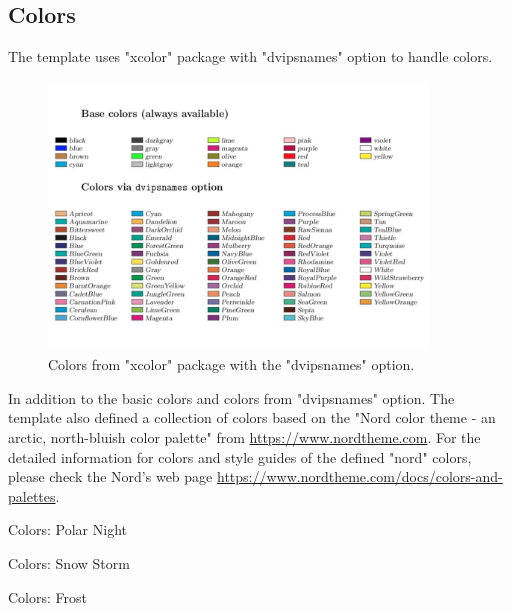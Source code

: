 \newpage
\subsection{Colors}
The template uses "xcolor" package with "dvipsnames" option to handle colors.

\begin{figure}[h!]
    \centering
    \includegraphics[width=0.9\textwidth]{chapter-1/sections/figs/colors.pdf}
    \caption{Colors from "xcolor" package with the "dvipsnames" option.}
\end{figure}

In addition to the basic colors and colors from "dvipsnames" option.
The template also defined a collection of colors based on the "Nord color theme
- an arctic, north-bluish color palette" from \url{https://www.nordtheme.com}.
For the detailed information for colors and style guides of the defined "nord" colors, please
check the Nord's web page
\url{https://www.nordtheme.com/docs/colors-and-palettes}. 

\noindent
Colors: Polar Night \\

\noindent
Colors: Snow Storm \\

\noindent
Colors: Frost \\

